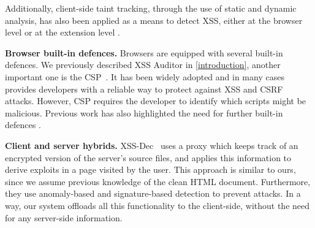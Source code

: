 Additionally, client-side taint tracking, through the use of static and dynamic analysis,
 has also been applied as a means to detect XSS, either
at the browser level or at the extension level \cite{8094406, 10.1007/978-3-642-04444-1_33}.

\noindent \textbf{Browser built-in defences.}  Browsers are equipped
with several built-in defences. We previously described XSS
Auditor in \autoref{introduction}, another important one is the 
 \ac{CSP}~\cite{CSP}. It has been widely adopted and
in many cases provides developers with a reliable way to protect
against \ac{XSS} and \ac{CSRF} attacks. However, \ac{CSP} requires the developer to identify which scripts
might be malicious. Previous work has also highlighted the need for further built-in defences \cite{6825636}.

\noindent \textbf{Client and server hybrids.}
XSS-Dec~\cite{Sundareswaran:2012:XHS:2352970.2352994} uses a proxy which keeps track of an encrypted version of the server's source files, and applies this information to derive exploits in a page visited by the user. This approach is similar to ours, since we assume previous
knowledge of the clean HTML document. Furthermore, they use anomaly-based and signature-based detection to prevent attacks. In a way, our system offloads all this functionality to the client-side, without the need for any server-side information.

